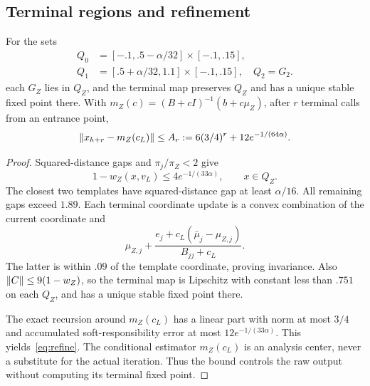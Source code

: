 \subsection{Terminal regions and refinement}
\begin{lemma}\label{lem:terminal}
For the sets
\begin{align}
Q_0&=[-.1,.5-\alpha/32]\times[-.1,.15],\\
Q_1&=[.5+\alpha/32,1.1]\times[-.1,.15],\quad Q_2=G_2.
\end{align}
each $G_Z$ lies in $Q_Z$, and the terminal map preserves $Q_Z$ and has a unique stable fixed point there. With $m_Z(c)=(B+cI)^{-1}(b+c\mu_Z)$, after $r$ terminal calls from an entrance point,
\begin{equation}\label{eq:refine}
\lVert x_{h+r}-m_Z(c_L)\rVert\le A_r:=6(3/4)^r+12e^{-1/(64\alpha)}.
\end{equation}
\end{lemma}
\begin{proof}
Squared-distance gaps and $\pi_j/\pi_Z<2$ give
\begin{equation}\label{eq:leak}
1-w_Z(x,v_L)\le4e^{-1/(33\alpha)},\qquad x\in Q_Z.
\end{equation}
The closest two templates have squared-distance gap at least $\alpha/16$. All remaining gaps exceed $1.89$. Each terminal coordinate update is a convex combination of the current coordinate and
\begin{equation}
\mu_{Z,j}+\frac{e_j+c_L(\bar\mu_j-\mu_{Z,j})}{B_{jj}+c_L}.
\end{equation}
The latter is within $.09$ of the template coordinate, proving invariance. Also $\lVert C\rVert\le9(1-w_Z)$, so the terminal map is Lipschitz with constant less than $.751$ on each $Q_Z$, and has a unique stable fixed point there.

The exact recursion around $m_Z(c_L)$ has a linear part with norm at most $3/4$ and accumulated soft-responsibility error at most $12e^{-1/(33\alpha)}$. This yields~\eqref{eq:refine}. The conditional estimator $m_Z(c_L)$ is an analysis center, never a substitute for the actual iteration. Thus the bound controls the raw output without computing its terminal fixed point.
\end{proof}

